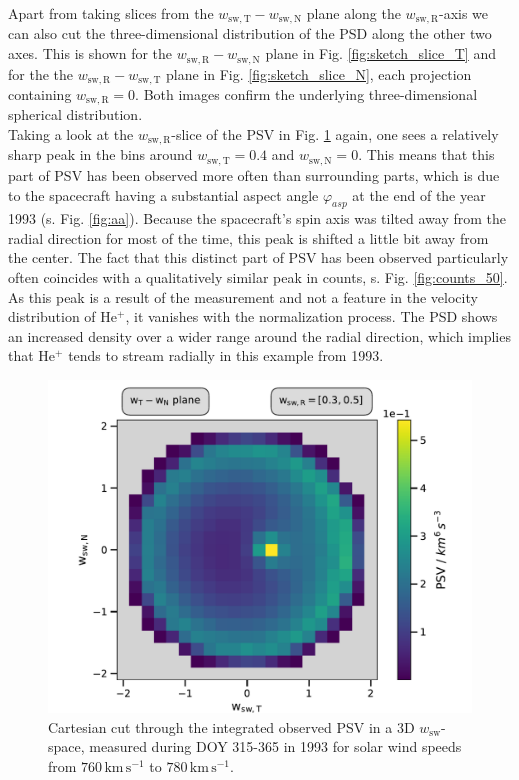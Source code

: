 Apart from taking slices from the $w_\mathrm{sw,T} - w_\mathrm{sw,N}$ plane along the $w_\mathrm{sw,R}$-axis we can also cut the three-dimensional distribution of the PSD along the other two axes. This is shown for the $w_\mathrm{sw,R} - w_\mathrm{sw,N}$ plane in Fig. \ref{fig:sketch_slice_T} and for the the $w_\mathrm{sw,R} - w_\mathrm{sw,T}$ plane in Fig. \ref{fig:sketch_slice_N}, each projection containing $w_\mathrm{sw,R} = 0$.
Both images confirm the underlying three-dimensional spherical distribution.
\\
Taking a look at the $w_\mathrm{sw,R}$-slice of the PSV in Fig. \ref{fig:norm_50} again, one sees a relatively sharp peak in the bins around $w_\mathrm{sw,T} = 0.4$ and $w_\mathrm{sw,N} = 0$. This means that this part of PSV has been observed more often than surrounding parts, which is due to the spacecraft having a substantial aspect angle $\varphi_{asp}$ at the end of the year 1993 (s. Fig. \ref{fig:aa}). Because the spacecraft's spin axis was tilted away from the radial direction for most of the time, this peak is shifted a little bit away from the center. The fact that this distinct part of PSV has been observed particularly often coincides with a qualitatively similar peak in counts, s. Fig. \ref{fig:counts_50}. 
As this peak is a result of the measurement and not a feature in the velocity distribution of $\mathrm{He^{+}}$, it vanishes with the normalization process. The PSD shows an increased density over a wider range around the radial direction, which implies that $\mathrm{He^{+}}$ tends to stream radially in this example from 1993.
\begin{figure}[h]
	\includegraphics[width=.85\textwidth]{Figures/slice_50_norm.pdf}
	\centering
	\caption{Cartesian cut through the integrated observed PSV in a 3D $w_\mathrm{sw}$-space, measured during DOY 315-365 in 1993 for solar wind speeds from $760 \, \mathrm{km\,s^{-1}}$ to $780 \, \mathrm{km\,s^{-1}}$.}
	\label{fig:norm_50}
\end{figure}
